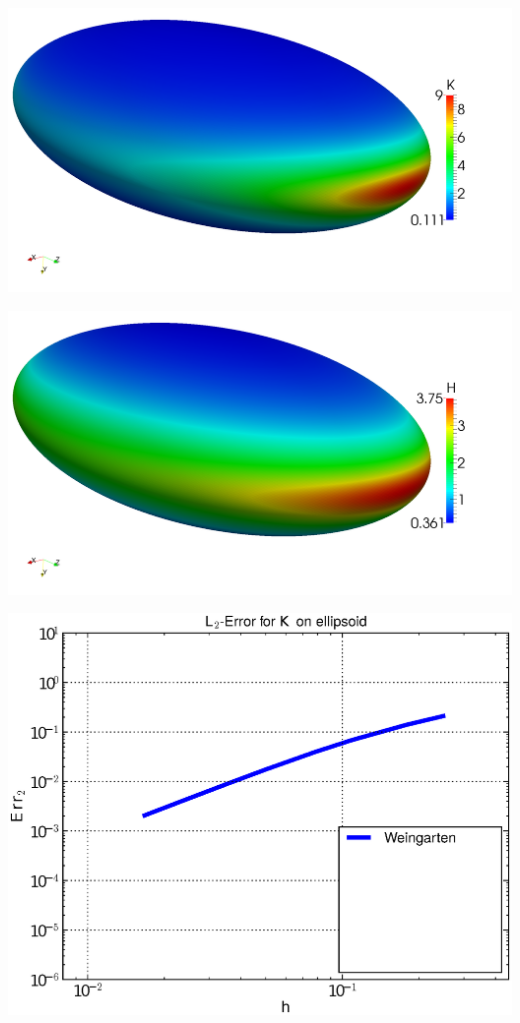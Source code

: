 \documentclass{beamer}
\begin{document}
\begin{frame}
\begin{overprint}
\begin{minipage}[t]{0.49\textwidth}
              \centering\includegraphics[width=\textwidth]{bilder/Curvature/heineC/K2k.png}
            \end{minipage}\hfill
            \begin{minipage}[t]{0.49\textwidth}
              \centering\includegraphics[width=\textwidth]{bilder/Curvature/heineC/H2k.png}
            \end{minipage}
          \begin{minipage}[t]{0.49\textwidth}
            \centering\includegraphics[width=\textwidth]{bilder/Curvature/heineC/ErrKL2_1.eps}

\end{minipage}
\end{overprint}
\end{frame}
\end{document}
